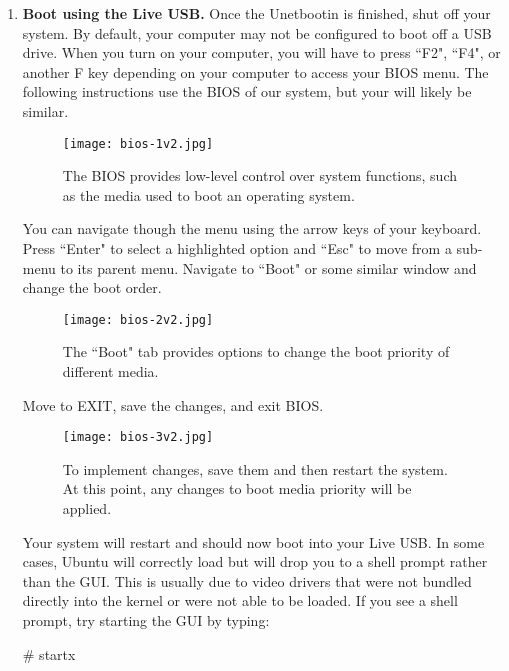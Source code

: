 \begin{enumerate}
\item \textbf{Boot using the Live USB.} Once the Unetbootin is finished, shut off your system. By default, your computer may not be configured to boot off a USB drive. When you turn on your computer, you will have to press ``F2", ``F4", or another F key depending on your computer to access your BIOS menu. The following instructions use the BIOS of our system, but your will likely be similar. 

\begin{figure}[h]
\begin{center}
\texttt{[image: bios-1v2.jpg]}
\caption[BIOS page]{The BIOS provides low-level control over system functions, such as the media used to boot an operating system.}
\end{center}
\end{figure}

You can navigate though the menu using the arrow keys of your keyboard. Press ``Enter" to select a highlighted option and ``Esc" to move from a sub-menu to its parent menu. Navigate to ``Boot" or some similar window and change the boot order. 

\begin{figure}[h]
\begin{center}
\texttt{[image: bios-2v2.jpg]}
\caption[BIOS boot order]{The ``Boot" tab provides options to change the boot priority of different media.}
\end{center}
\end{figure}

Move to EXIT, save the changes, and exit BIOS. 

\begin{figure}[h]
\begin{center}
\texttt{[image: bios-3v2.jpg]}
\caption[BIOS exit]{To implement changes, save them and then restart the system. At this point, any changes to boot media priority will be applied.}
\end{center}
\end{figure}

Your system will restart and should now boot into your Live USB. In some cases, Ubuntu will correctly load but will drop you to a shell prompt rather than the GUI. This is usually due to video drivers that were not bundled directly into the kernel or were not able to be loaded. If you see a shell prompt, try starting the GUI by typing:

\begin{example}
\# startx
\end{example}
\end{enumerate}

